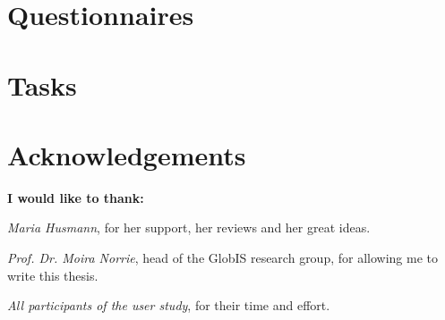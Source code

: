 \documentclass[11pt,a4paper]{globis-book}
\begin{document}
\appendix

\chapter{Questionnaires}
\label{sec:questionnaires}
\newpage

\newpage

\newpage

\newpage


\chapter{Tasks}
\label{sec:tasks}
\newpage

\newpage

\newpage

\newpage



\listoffigures

\chapter*{Acknowledgements}

\begin{center}
	\textbf{I would like to thank:}
\end{center}

\textit{Maria Husmann}, for her support, her reviews and her great ideas.

\textit{Prof. Dr. Moira Norrie}, head of the GlobIS research group, for allowing me to write this thesis.

\textit{All participants of the user study}, for their time and effort.

\newpage
\thispagestyle{empty}




\newpage

\end{document}

